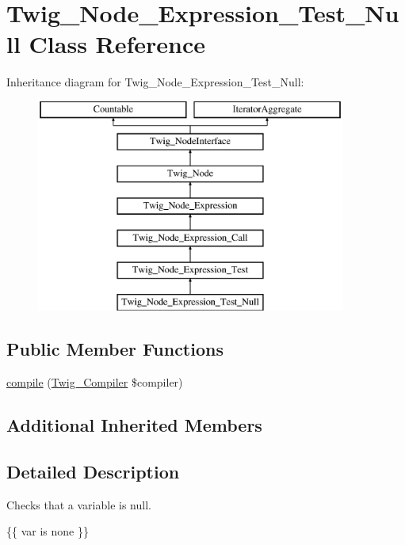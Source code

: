 \hypertarget{classTwig__Node__Expression__Test__Null}{}\section{Twig\+\_\+\+Node\+\_\+\+Expression\+\_\+\+Test\+\_\+\+Null Class Reference}
\label{classTwig__Node__Expression__Test__Null}
Inheritance diagram for Twig\+\_\+\+Node\+\_\+\+Expression\+\_\+\+Test\+\_\+\+Null\+:\begin{figure}[H]
\begin{center}
\leavevmode
\includegraphics[height=7.000000cm]{classTwig__Node__Expression__Test__Null}
\end{center}
\end{figure}
\subsection*{Public Member Functions}
\begin{DoxyCompactItemize}
\item 
\hyperlink{classTwig__Node__Expression__Test__Null_ab4f800407bb558a77dd5239e8c609d95}{compile} (\hyperlink{classTwig__Compiler}{Twig\+\_\+\+Compiler} \$compiler)
\end{DoxyCompactItemize}
\subsection*{Additional Inherited Members}


\subsection{Detailed Description}
Checks that a variable is null.


\begin{DoxyPre}
 \{\{ var is none \}\}
\end{DoxyPre}


